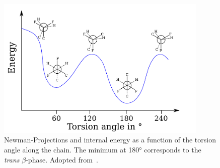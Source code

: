 \begin{figure}
\centering
	\includegraphics[width=0.9\textwidth]{./figs/chap1/fischerproject}
	\caption[Newman-Projections and internal energy as a function of the torsion angle along the chain. The minimum at \ang{180} corresponds to the \emph{trans} $\beta$-phase.]{Newman-Projections and internal energy as a function of the torsion angle along the chain. The minimum at \ang{180} corresponds to the \emph{trans} $\beta$-phase. Adopted from~\cite[p. 809]{encyclopedia}.}
	\label{fig:pvfischer}
\end{figure}
